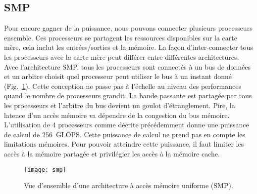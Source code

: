 \subsection{SMP}
Pour encore gagner de la puissance, nous pouvons connecter plusieurs processeurs ensemble.
%
Ces processeurs se partagent les ressources disponibles sur la carte mère, cela inclut les entrées/sorties et la mémoire.
%
La façon d'inter-connecter tous les processeurs avec la carte mère peut différer entre différentes architectures.
%
Avec l'architecture SMP, tous les processeurs sont connectés à un bus de données et un arbitre choisit quel processeur peut utiliser le bus à un instant donné (Fig.~\ref{fig:smp}).
%
Cette conception ne passe pas à l'échelle au niveau des performances quand le nombre de processeurs grandit.
%
La bande passante est partagée par tous les processeurs et l'arbitre du bus devient un goulot d'étranglement.
%
Pire, la latence d'un accès mémoire va dépendre de la congestion du bus mémoire.
%
L'utilisation de 4 processeurs comme décrite précédemment donne une puissance de calcul de 256~GLOPS.
%
Cette puissance de calcul ne prend pas en compte les limitations mémoires.
%
Pour pouvoir atteindre cette puissance, il faut limiter les accès à la mémoire partagée et privilégier les accès à la mémoire cache.

\begin{figure}[!h]
        \centering
        \texttt{[image: smp]}
        \caption{Vue d'ensemble d'une architecture à accès mémoire uniforme (SMP).}
        \label{fig:smp}
\end{figure}
